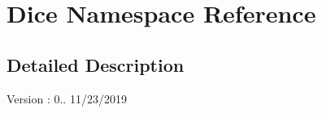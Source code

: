 \hypertarget{namespace_dice}{}\section{Dice Namespace Reference}
\label{namespace_dice}


\subsection{Detailed Description}
\begin{DoxyVersion}{Version}
\+: 0.. 11/23/2019 
\end{DoxyVersion}
